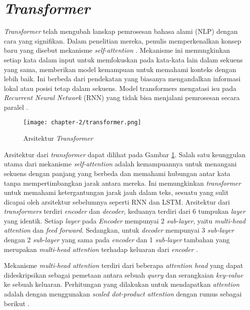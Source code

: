 \section{\textit{Transformer}}

\textit{Transformer} telah mengubah lanskap pemrosesan bahasa alami (NLP) dengan cara yang signifikan. Dalam penelitian mereka, penulis memperkenalkan konsep baru yang disebut mekanisme \textit{self-attention} \parencite{transformers}. Mekanisme ini memungkinkan setiap kata dalam input untuk memfokuskan pada kata-kata lain dalam sekuens yang sama, memberikan model kemampuan untuk memahami konteks dengan lebih baik. Ini berbeda dari pendekatan yang biasanya mengandalkan informasi lokal atau posisi tetap dalam sekuens. Model transformers mengatasi isu pada \textit{Recurrent Neural Network} (RNN) yang tidak bisa menjalani pemrosesan secara paralel \parencite{transformers}.

\begin{figure}[ht]
    \centering
    \texttt{[image: chapter-2/transformer.png]}
    \caption{Arsitektur \textit{Transformer} \parencite{transformers}}
    \label{fig:transformer}
\end{figure}

Arsitektur dari \textit{transformer} dapat dilihat pada Gambar \ref{fig:transformer}. Salah satu keunggulan utama dari mekanisme \textit{self-attention} adalah kemampuannya untuk menangani sekuens dengan panjang yang berbeda dan memahami hubungan antar kata tanpa mempertimbangkan jarak antara mereka. Ini memungkinkan \textit{transformer} untuk memahami ketergantungan jarak jauh dalam teks, sesuatu yang sulit dicapai oleh arsitektur sebelumnya seperti RNN dan LSTM. Arsitektur dari \textit{transformers} terdiri \textit{encoder} dan \textit{decoder}, keduanya terdiri dari 6 tumpukan \textit{layer} yang identik. Setiap \textit{layer} pada \textit{Encoder} mempunyai 2 \textit{sub-layer}, yaitu \textit{multi-head attention} dan \textit{feed forward}. Sedangkan, untuk \textit{decoder} mempunyai 3 \textit{sub-layer} dengan 2 \textit{sub-layer} yang sama pada \textit{encoder} dan 1 \textit{sub-layer} tambahan yang merupakan \textit{multi-head attention} terhadap keluaran dari \textit{encoder} \parencite{transformers}.

Mekanisme \textit{multi-head attention} terdiri dari beberapa \textit{attention head} yang dapat dideskripsikan sebagai pemetaan antara sebuah \textit{query} dan serangkaian \textit{key-value} ke sebuah keluaran. Perhitungan yang dilakukan untuk mendapatkan \textit{attention} adalah dengan menggunakan \textit{scaled dot-product attention} dengan rumus sebagai berikut \parencite{transformers}.


